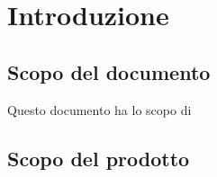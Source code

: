 \section{Introduzione}
\subsection{Scopo del documento}
Questo documento ha lo scopo di

\subsection{Scopo del prodotto}
%
